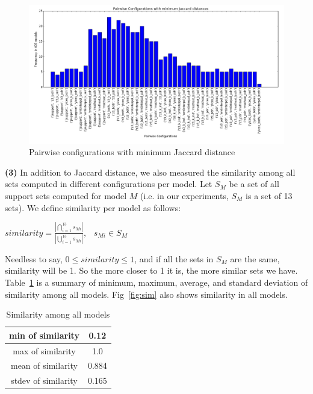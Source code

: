 \begin{figure}
  \centering
  \includegraphics[width=\textwidth]{figs/min_settings_analyses.png}
  \caption{Pairwise configurations with minimum Jaccard distance}\label{fig:mindis}
\end{figure}

\noindent{}
 \vspace{9pt}

\textbf{(3)} In addition to Jaccard distance, we also measured the similarity among all sets computed in different configurations per model. Let $S_M$ be a set of all support sets computed for model $M$ (i.e. in our experiments, $S_M$ is a set of 13 sets).  We define similarity per model as follows:

\begin{center}
$similarity = \frac{|\bigcap_{i=1}^{13} s_{Mi}|}{|\bigcup_{i=1}^{13} s_{Mi}|}, \hspace{9pt} s_{Mi} \in S_M$
\end{center}
\vspace{6pt} 

Needless to say, $0 \leq similarity \leq 1$, and if all the sets in $S_M$ are the same, similarity will be 1. So the more closer to 1 it is, the more similar sets we have. Table~\ref{tab:sim} is a summary of minimum, maximum, average, and standard deviation of similarity among all models. Fig~\ref{fig:sim} also shows similarity in all models.

\begin{table}
  \centering
  \begin{tabular}{ |c|c|}
    \hline
     min of similarity& 0.12 \\[0.5ex]
     \hline
     max of similarity& 1.0\\[0.5ex]
     \hline
     mean of similarity & 0.884\\[0.5ex]
     \hline
     stdev of similarity & 0.165\\[0.5ex]
    \hline
  \end{tabular}
  \caption{\small{Similarity among all models}}
  \label{tab:sim}
\end{table}

